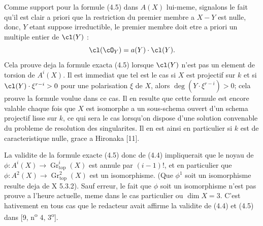 Comme support pour la formule (4.5) dans $A(X)$ lui-meme, signalons le fait qu'il est clair a priori que la restriction du premier membre a $X - Y$ est nulle, donc, $Y$ etant suppose irreductible, le premier membre doit etre a priori un multiple entier de $\cl(Y)$ :
\[
\cl(\cO_Y) = a(Y) \cdot \cl(Y).
\]
Cela prouve deja la formule exacta (4.5) lorsque $\cl(Y)$ n'est pas un element de torsion de $A^{i}(X)$. Il est immediat que tel est le cas si $X$ est projectif sur $k$ et si $\cl(Y) \cdot \xi^{r-i} > 0$ pour une polarisation $\xi$ de $X$, alors $\deg(Y \cdot \xi^{r-i}) > 0$; cela prouve la formule voulue dans ce cas. Il en resulte que cette formule est encore valable chaque fois que $X$ est isomorphe a un sous-schema ouvert d'un schema projectif lisse sur $k$, ce qui sera le cas lorsqu'on dispose d'une solution convenable du probleme de resolution des singularites. Il en est ainsi en particulier si $k$ est de caracteristique nulle, grace a Hironaka [11].

La validite de la formule exacte (4.5) donc de (4.4) impliquerait que le noyau de $\phi : A^{i}(X) \to \operatorname{Gr}_{\mathrm{top}}^{i}(X)$ est annule par $(i-1)!$, et en particulier que $\phi : A^{2}(X) \to \operatorname{Gr}_{\mathrm{top}}^{2}(X)$ est un isomorphisme. (Que $\phi^1$ soit un isomorphisme resulte deja de X 5.3.2). Sauf erreur, le fait que $\phi$ soit un isomorphisme n'est pas prouve a l'heure actuelle, meme dans le cas particulier ou $\dim X = 3$. C'est hativement en tous cas que le redacteur avait affirme la validite de (4.4) et (4.5) dans [9, n\textsuperscript{o} 4, 3\textsuperscript{o}].

